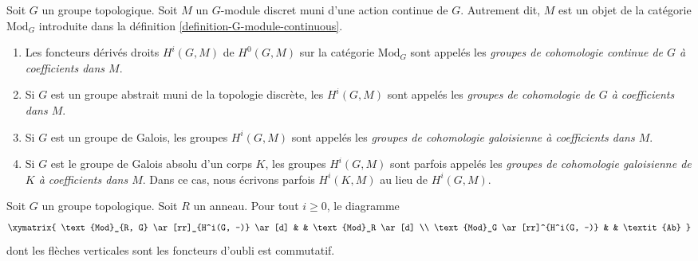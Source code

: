 \begin{definition}
\label{definition-galois-cohomology}
Soit $G$ un groupe topologique. Soit $M$ un $G$-module discret
muni d'une action continue de $G$. Autrement dit, $M$ est un objet
de la cat\'egorie $\text{Mod}_G$ introduite dans la
d\'efinition \ref{definition-G-module-continuous}.
\begin{enumerate}
\item Les foncteurs d\'eriv\'es droits $H^i(G, M)$ de $H^0(G, M)$ sur la
cat\'egorie $\text{Mod}_G$ sont appel\'es les
{\it groupes de cohomologie continue de $G$ \`a coefficients dans $M$}.
\item Si $G$ est un groupe abstrait muni de la topologie discr\`ete,
les $H^i(G, M)$ sont appel\'es les {\it groupes de cohomologie de $G$ \`a coefficients dans $M$}.
\item Si $G$ est un groupe de Galois, les groupes $H^i(G, M)$ sont appel\'es
les {\it groupes de cohomologie galoisienne \`a coefficients dans $M$}.
\item Si $G$ est le groupe de Galois absolu d'un corps $K$, les groupes
$H^i(G, M)$ sont parfois appel\'es les {\it groupes de cohomologie galoisienne de $K$
\`a coefficients dans $M$}. Dans ce cas, nous \'ecrivons parfois
$H^i(K, M)$ au lieu de $H^i(G, M)$.
\end{enumerate}
\end{definition}

\begin{lemma}
\label{lemma-modules-abelian}
Soit $G$ un groupe topologique. Soit $R$ un anneau.
Pour tout $i \geq 0$, le diagramme
$$
\xymatrix{
\text{Mod}_{R, G} \ar[rr]_{H^i(G, -)} \ar[d] & &
\text{Mod}_R \ar[d] \\
\text{Mod}_G \ar[rr]^{H^i(G, -)} & &
\textit{Ab}
}
$$
dont les fl\`eches verticales sont les foncteurs d'oubli est commutatif.
\end{lemma}

